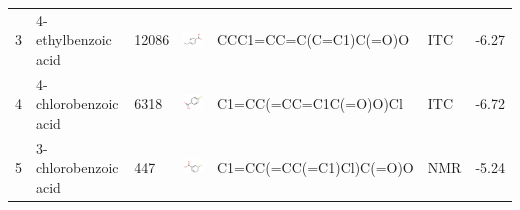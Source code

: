 \documentclass[aps,pre,twocolumn,nofootinbib,superscriptaddress,10pt, final,tightenlines]{revtex4-1}
\begin{document}
\begin{table}
\begin{tabular}{lllp{2cm}>{\ttfamily}llS[table-format=-1.2, table-figures-uncertainty=1]}
3            & 4-ethylbenzoic acid                      & 12086            & \parbox[c]{1em}{\includegraphics[scale=0.2]{figures/12086.pdf}} & CCC1=CC=C(C=C1)C(=O)O            & ITC    & -6.27      \\
4            & 4-chlorobenzoic acid                     & 6318             & \parbox[c]{1em}{\includegraphics[scale=0.2]{figures/6318.pdf}}  & C1=CC(=CC=C1C(=O)O)Cl            & ITC    & -6.72      \\
5            & 3-chlorobenzoic acid                     & 447              & \parbox[c]{1em}{\includegraphics[scale=0.2]{figures/447.pdf}}   & C1=CC(=CC(=C1)Cl)C(=O)O          & NMR    &  -5.24     \\

\end{tabular}
\end{table}
\end{document}
